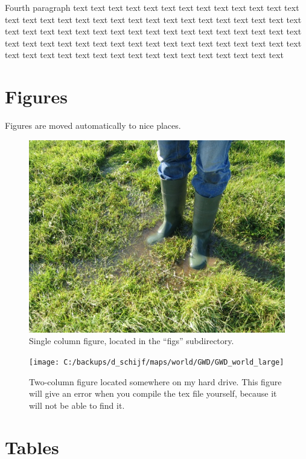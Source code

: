\documentclass[twocolumn, 10pt, a4paper]{article}
\begin{document}
Fourth paragraph
text text text text text text text text text text text text text text text text 
text text text text text text text text text text text text text text text text
text text text text text text text text text text text text text text text text
text text text text text text text text text text text text text text text text
text text text text text text text text text text text text text text text text



\section{Figures}

Figures are moved automatically to nice places.

\begin{figure}
	\center
	\includegraphics[width=\columnwidth]{figs/ponds.jpg}
	\caption{Single column figure, located in the ``figs'' subdirectory.}
	\label{fig: ponds}
\end{figure}

\begin{figure}
	\center
	\texttt{[image: C:/backups/d\_schijf/maps/world/GWD/GWD\_world\_large]}
	\caption{Two-column figure located somewhere on my hard drive. This figure will give an error when you compile the tex file yourself, because it will not be able to find it.}
	\label{fig: GWD world}
\end{figure}



\section{Tables}
\end{document}

